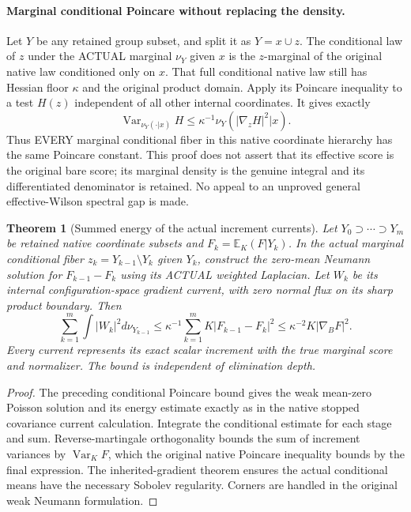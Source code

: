 \documentclass[11pt]{article}
\newtheorem{theorem}{Theorem}
\newcommand{\E}{\mathbb E}
\newcommand{\Var}{\operatorname{Var}}
\begin{document}
\paragraph{Marginal conditional Poincare without replacing the density.}
Let $Y$ be any retained group subset, and split it as $Y=x\cup z$. The conditional law
of $z$ under the ACTUAL marginal $\nu_Y$ given $x$ is the $z$-marginal of the original
native law conditioned only on $x$. That full conditional native law still has Hessian
floor $\kappa$ and the original product domain. Apply its Poincare inequality to a test
$H(z)$ independent of all other internal coordinates. It gives exactly
\[
 \Var_{\nu_Y(\cdot|x)}H\le\kappa^{-1}
       \nu_Y(|\nabla_zH|^2|x).
\]
Thus EVERY marginal conditional fiber in this native coordinate hierarchy has the same
Poincare constant. This proof does not assert that its effective score is the original
bare score; its marginal density is the genuine integral and its differentiated denominator
is retained. No appeal to an unproved general effective-Wilson spectral gap is made.

\begin{theorem}[Summed energy of the actual increment currents]
Let $Y_0\supset\cdots\supset Y_m$ be retained native coordinate subsets and
$F_k=\E_K(F|Y_k)$. In the actual marginal conditional fiber
$z_k=Y_{k-1}\setminus Y_k$ given $Y_k$, construct the zero-mean Neumann solution
for $F_{k-1}-F_k$ using its ACTUAL weighted Laplacian. Let $W_k$ be its internal
configuration-space gradient current, with zero normal flux on its sharp product boundary.
Then
\[
 \sum_{k=1}^m\int|W_k|^2d\nu_{Y_{k-1}}
 \le\kappa^{-1}\sum_{k=1}^mK|F_{k-1}-F_k|^2
 \le\kappa^{-2}K|\nabla_BF|^2.
\]
Every current represents its exact scalar increment with the true marginal score and
normalizer. The bound is independent of elimination depth.
\end{theorem}
\begin{proof}
The preceding conditional Poincare bound gives the weak mean-zero Poisson solution and
its energy estimate exactly as in the native stopped covariance current calculation. Integrate the conditional estimate for each
stage and sum. Reverse-martingale orthogonality bounds the sum of increment variances
by $\Var_KF$, which the original native Poincare inequality bounds by the final expression.
The inherited-gradient theorem ensures the actual conditional means have the necessary
Sobolev regularity. Corners are handled in the original weak Neumann formulation.
\end{proof}
\end{document}
